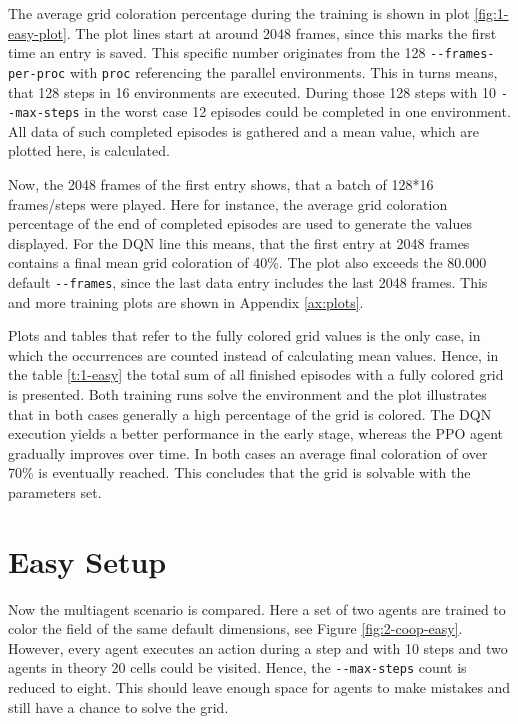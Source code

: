 The average grid coloration percentage during the training is shown in plot \ref{fig:1-easy-plot}. The plot lines start at around 2048 frames, since this marks the first time an entry is saved. This specific number originates from the 128 \verb|--frames-per-proc| with \verb|proc| referencing the parallel environments. This in turns means, that 128 steps in 16 environments are executed. During those 128 steps with 10 \verb|--max-steps| in the worst case 12 episodes could be completed in one environment. All data of such completed episodes is gathered and a mean value, which are plotted here, is calculated. 

Now, the 2048 frames of the first entry shows, that a batch of 128*16 frames/steps were played. Here for instance, the average grid coloration percentage of the end of completed episodes are used to generate the values displayed. For the DQN line this means, that the first entry at 2048 frames contains a final mean grid coloration of 40\%. The plot also exceeds the 80.000 default \verb|--frames|, since the last data entry includes the last 2048 frames. This and more training plots are shown in Appendix \ref{ax:plots}.

Plots and tables that refer to the fully colored grid values is the only case, in which the occurrences are counted instead of calculating mean values. 
Hence, in the table \ref{t:1-easy} the total sum of all finished episodes with a fully colored grid is presented.
Both training runs solve the environment and the plot illustrates that in both cases generally a high percentage of the grid is colored. The DQN execution yields a better performance in the early stage, whereas the PPO agent gradually improves over time. In both cases an average final coloration of over 70\% is eventually reached. This concludes that the grid is solvable with the parameters set.

\section{Easy Setup} \label{easy_env}

Now the multiagent scenario is compared. Here a set of two agents are trained to color the field of the same default dimensions, see Figure \ref{fig:2-coop-easy}. However, every agent executes an action during a step and with 10 steps and two agents in theory 20 cells could be visited. Hence, the \verb|--max-steps| count is reduced to eight. This should leave enough space for agents to make mistakes and still have a chance to solve the grid.

